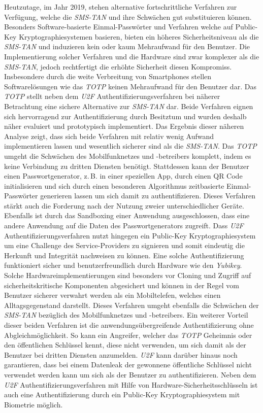 \documentclass[11pt,a4paper,ngerman]{scrreprt}
\begin{document}
Heutzutage, im Jahr 2019, stehen alternative fortschrittliche Verfahren zur Verfügung, welche die \textit{SMS-TAN} und ihre Schwächen gut substituieren können. Besonders Software-basierte Einmal-Passwörter und Verfahren welche auf Public-Key Kryptographiesystemen basieren, bieten ein höheres Sicherheitsniveau als die \textit{SMS-TAN} und induzieren kein oder kaum Mehraufwand für den Benutzer. Die Implementierung solcher Verfahren und die Hardware sind zwar komplexer als die \textit{SMS-TAN}, jedoch rechtfertigt die erhöhte Sicherheit diesen Kompromiss. Insbesondere durch die weite Verbreitung von Smartphones stellen Softwarelösungen wie das \textit{TOTP} keinen Mehraufwand für den Benutzer dar. Das \textit{TOTP} stellt neben dem \textit{U2F} Authentifizierungsverfahren bei näherer Betrachtung eine sichere Alternative zur \textit{SMS-TAN} dar. Beide Verfahren eignen sich hervorragend zur Authentifizierung durch Besitztum und wurden deshalb näher evaluiert und prototypisch implementiert. Das Ergebnis dieser näheren Analyse zeigt, dass sich beide Verfahren mit relativ wenig Aufwand implementieren lassen und wesentlich sicherer sind als die \textit{SMS-TAN}. Das \textit{TOTP} umgeht die Schwächen des Mobilfunknetzes und -betreibers komplett, indem es keine Verbindung zu dritten Diensten benötigt. Stattdessen kann der Benutzer einen Passwortgenerator, z.\,B. in einer speziellen App, durch einen QR Code initialisieren und sich durch einen besonderen Algorithmus zeitbasierte Einmal-Passwörter generieren lassen um sich damit zu authentifizieren. Dieses Verfahren stärkt auch die Forderung nach der Nutzung zweier unterschiedlicher Geräte. Ebenfalls ist durch das Sandboxing einer Anwendung ausgeschlossen, dass eine andere Anwendung auf die Daten des Passwortgenerators zugreift. Dass \textit{U2F} Authentifizierungsverfahren nutzt hingegen ein Public-Key Kryptographiesystem um eine Challenge des Service-Providers zu signieren und somit eindeutig die Herkunft und Integrität nachweisen zu können. Eine solche Authentifizierung funktioniert sicher und benutzerfreundlich durch Hardware wie den \textit{Yubikey}. Solche Hardwareimplementierungen sind besonders vor Cloning und Zugriff auf sicherheitskritische Komponenten abgesichert und können in der Regel vom Benutzer sicherer verwahrt werden als ein Mobiltelefen, welches einen Alltagsgegenstand darstellt. Dieses Verfahren umgeht ebenfalls die Schwächen der \textit{SMS-TAN} bezüglich des Mobilfunknetzes und -betreibers. Ein weiterer Vorteil dieser beiden Verfahren ist die anwendungsübergreifende Authentifizierung ohne Abgleichmöglichkeit. So kann ein Angreifer, welcher das \textit{TOTP} Geheimnis oder den öffentlichen Schlüssel kennt, diese nicht verwenden, um sich damit als der Benutzer bei dritten Diensten anzumelden. \textit{U2F} kann darüber hinaus noch garantieren, dass bei einem Datenleak der gewonnene öffentliche Schlüssel nicht verwendet werden kann um sich als der Benutzer zu authentifizieren. Neben dem \textit{U2F} Authentifizierungsverfahren mit Hilfe von Hardware-Sicherheitsschlüsseln ist auch eine Authentifizierung durch ein Public-Key Kryptographiesystem mit Biometrie möglich.
\end{document}

